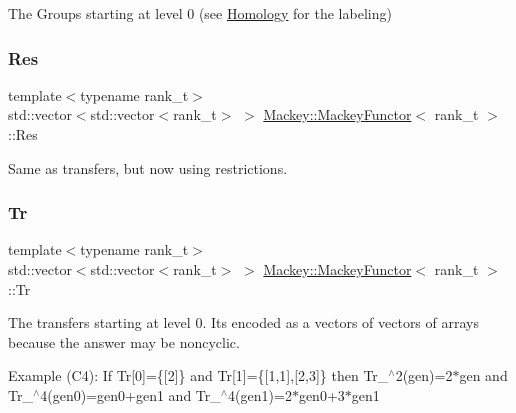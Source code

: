 The Groups starting at level 0 (see \hyperlink{classMackey_1_1Homology}{Homology} for the labeling) 

\mbox{\label{classMackey_1_1MackeyFunctor_a9299f915835edaa2b67880bfe6330502}} 
\subsubsection{\texorpdfstring{Res}{Res}}
{\footnotesize\ttfamily template$<$typename rank\+\_\+t$>$ \\
std\+::vector$<$std\+::vector$<$rank\+\_\+t$>$ $>$ \hyperlink{classMackey_1_1MackeyFunctor}{Mackey\+::\+Mackey\+Functor}$<$ rank\+\_\+t $>$\+::Res}



Same as transfers, but now using restrictions. 

\mbox{\label{classMackey_1_1MackeyFunctor_a3106846b46d3eb4d297abe785bdb0481}} 
\subsubsection{\texorpdfstring{Tr}{Tr}}
{\footnotesize\ttfamily template$<$typename rank\+\_\+t$>$ \\
std\+::vector$<$std\+::vector$<$rank\+\_\+t$>$ $>$ \hyperlink{classMackey_1_1MackeyFunctor}{Mackey\+::\+Mackey\+Functor}$<$ rank\+\_\+t $>$\+::Tr}



The transfers starting at level 0. It\textquotesingle{}s encoded as a vectors of vectors of arrays because the answer may be noncyclic. 

Example (C4)\+: If Tr\mbox{[}0\mbox{]}=\{\mbox{[}2\mbox{]}\} and Tr\mbox{[}1\mbox{]}=\{\mbox{[}1,1\mbox{]},\mbox{[}2,3\mbox{]}\} then Tr\+\_$^\wedge$2(gen)=2$\ast$gen and Tr\+\_$^\wedge$4(gen0)=gen0+gen1 and Tr\+\_$^\wedge$4(gen1)=2$\ast$gen0+3$\ast$gen1 \mbox{\label{classMackey_1_1MackeyFunctor_aa6488386f0731b1a2c80b494376709a0}} 
